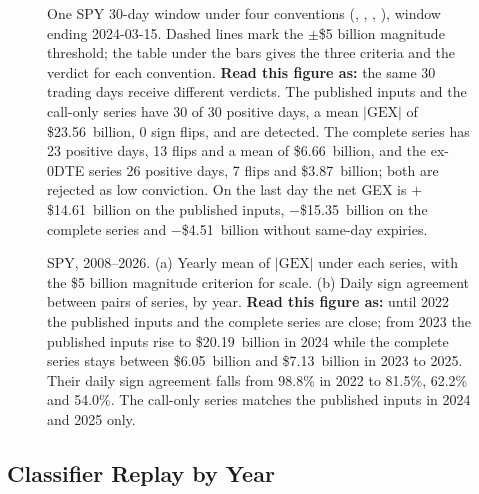 \begin{figure}[H]
\centering
\resultfigure{\figWindow}
\caption{One SPY 30-day window under four conventions (, , , ), window ending 2024-03-15. Dashed lines mark the $\pm$\$5 billion magnitude threshold; the table under the bars gives the three criteria and the verdict for each convention. \textbf{Read this figure as:} the same 30 trading days receive different verdicts. The published inputs and the call-only series have 30 of 30 positive days, a mean $|\mathrm{GEX}|$ of \$23.56~billion, 0 sign flips, and are detected. The complete series has 23 positive days, 13 flips and a mean of \$6.66~billion, and the ex-0DTE series 26 positive days, 7 flips and \$3.87~billion; both are rejected as low conviction. On the last day the net GEX is $+$\$14.61~billion on the published inputs, $-$\$15.35~billion on the complete series and $-$\$4.51~billion without same-day expiries.}
\label{fig:window}
\end{figure}

\begin{figure}[H]
\centering
\resultfigure{\figSeries}
\caption{SPY, 2008--2026. (a) Yearly mean of $|\mathrm{GEX}|$ under each series, with the \$5 billion magnitude criterion for scale. (b) Daily sign agreement between pairs of series, by year. \textbf{Read this figure as:} until 2022 the published inputs and the complete series are close; from 2023 the published inputs rise to \$20.19~billion in 2024 while the complete series stays between \$6.05~billion and \$7.13~billion in 2023 to 2025. Their daily sign agreement falls from 98.8\% in 2022 to 81.5\%, 62.2\% and 54.0\%. The call-only series matches the published inputs in 2024 and 2025 only.}
\label{fig:series}
\end{figure}

\subsection{Classifier Replay by Year}
\label{sec:results:replay}

